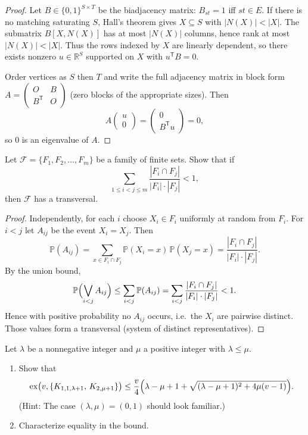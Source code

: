 \documentclass[11pt, a4paper]{ctexrep}
\begin{document}
\begin{proof}
    Let $B\in\{0,1\}^{S\times T}$ be the biadjacency matrix: $B_{st}=1$ iff $st\in E$.
    If there is no matching saturating $S$, Hall's theorem gives $X\subseteq S$ with $|N(X)|<|X|$.
    The submatrix $B[X,N(X)]$ has at most $|N(X)|$ columns, hence rank at most $|N(X)|<|X|$.
    Thus the rows indexed by $X$ are linearly dependent, so there exists nonzero $u\in\mathbb{R}^{S}$ supported on $X$ with $u^{\mathsf T}B=0$.

    Order vertices as $S$ then $T$ and write the full adjacency matrix in block form
    $A=\begin{pmatrix}O&B\\ B^{\mathsf T}&O\end{pmatrix}$ \textup{(}zero blocks of the appropriate sizes\textup{)}.
    Then
    \[
        A\begin{pmatrix}u\\ 0\end{pmatrix}
        =\begin{pmatrix}0\\ B^{\mathsf T}u\end{pmatrix}
        =0,
    \]
    so $0$ is an eigenvalue of $A$.
\end{proof}

\begin{exercise}
    Let $\mathcal{F}=\{F_1,F_2,\dots,F_m\}$ be a family of finite sets.
    Show that if
    \[
        \sum_{1\le i<j\le m} \frac{|F_i\cap F_j|}{|F_i|\cdot|F_j|} < 1,
    \]
    then $\mathcal{F}$ has a transversal.
\end{exercise}

\begin{proof}
    Independently, for each $i$ choose $X_i\in F_i$ uniformly at random from $F_i$.
    For $i<j$ let $A_{ij}$ be the event $X_i=X_j$.
    Then
    \[
        \mathbb{P}(A_{ij})
        =\sum_{x\in F_i\cap F_j}\mathbb{P}(X_i=x)\,\mathbb{P}(X_j=x)
        =\frac{|F_i\cap F_j|}{|F_i|\cdot|F_j|}.
    \]
    By the union bound,
    \[
        \mathbb{P}\Bigl(\bigvee_{i<j} A_{ij}\Bigr)
        \le \sum_{i<j}\mathbb{P}(A_{ij})
        =\sum_{i<j}\frac{|F_i\cap F_j|}{|F_i|\cdot|F_j|}
        <1.
    \]
    Hence with positive probability no $A_{ij}$ occurs, i.e.\ the $X_i$ are pairwise distinct.
    Those values form a transversal (system of distinct representatives).
\end{proof}

\begin{exercise}
    Let $\lambda$ be a nonnegative integer and $\mu$ a positive integer with $\lambda\le\mu$.
    \begin{enumerate}
        \item[(a)] Show that
              \[
                  \mathrm{ex}\bigl(v,\{K_{1,1,\lambda+1},\,K_{2,\mu+1}\}\bigr)
                  \le \frac{v}{4}\Bigl(\lambda-\mu+1+\sqrt{(\lambda-\mu+1)^2+4\mu(v-1)}\Bigr).
              \]
              \textup{(}Hint: The case $(\lambda,\mu)=(0,1)$ should look familiar.\textup{)}
        \item[(b)] Characterize equality in the bound.
    \end{enumerate}
\end{exercise}
\end{document}
